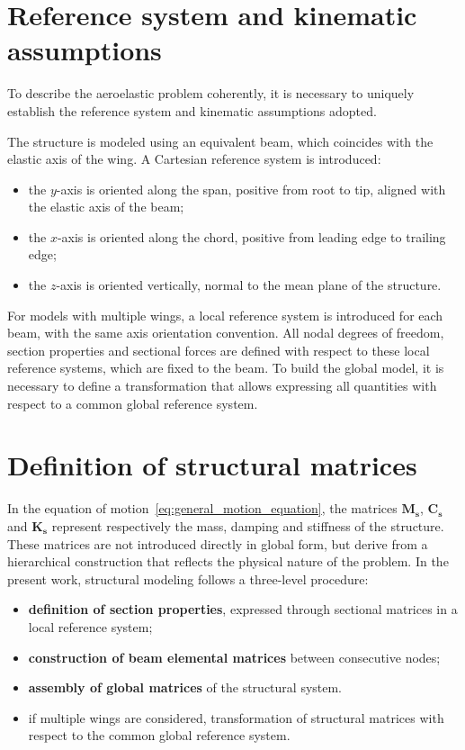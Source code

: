 \section{Reference system and kinematic assumptions}
To describe the aeroelastic problem coherently, it is necessary to uniquely establish the reference system and kinematic assumptions adopted.

The structure is modeled using an equivalent beam, which coincides with the elastic axis of the wing. A Cartesian reference system is introduced:
\begin{itemize}
    \item the $y$-axis is oriented along the span, positive from root to tip, aligned with the elastic axis of the beam;
    \item the $x$-axis is oriented along the chord, positive from leading edge to trailing edge;
    \item the $z$-axis is oriented vertically, normal to the mean plane of the structure.
\end{itemize}

For models with multiple wings, a local reference system is introduced for each beam, with the same axis orientation convention.
All nodal degrees of freedom, section properties and sectional forces are defined with respect to these local reference systems, which are fixed to the beam.
To build the global model, it is necessary to define a transformation that allows expressing all quantities with respect to a common global reference system.

\section{Definition of structural matrices}
In the equation of motion~\ref{eq:general_motion_equation}, the matrices $\mathbf{M_s}$, $\mathbf{C_s}$ and $\mathbf{K_s}$ represent respectively the mass, damping and stiffness of the structure.
These matrices are not introduced directly in global form, but derive from a hierarchical construction that reflects the physical nature of the problem.
In the present work, structural modeling follows a three-level procedure:
\begin{itemize}
    \item \textbf{definition of section properties}, expressed through sectional matrices in a local reference system;
    \item \textbf{construction of beam elemental matrices} between consecutive nodes;
    \item \textbf{assembly of global matrices} of the structural system.
    \item if multiple wings are considered, transformation of structural matrices with respect to the common global reference system.
\end{itemize}

